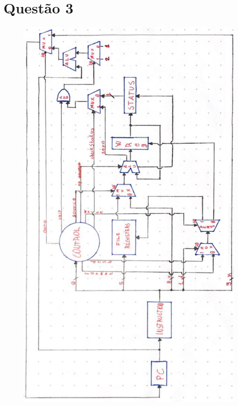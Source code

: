 \documentclass[12pt]{report}
\begin{document}
	\section*{Questão 3}
		\begin{figure}[H]
			\centering
			\includegraphics{datapath.jpg}
		\end{figure}
	\clearpage
\end{document}
